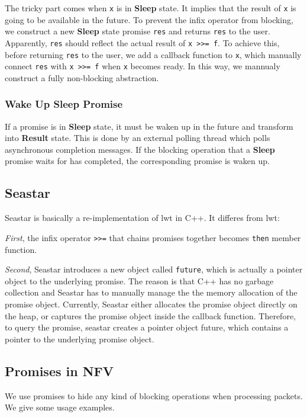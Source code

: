 The tricky part comes when \verb!x! is in \textbf{Sleep} state. It implies that
the result of \verb!x! is going to be available in the future. To prevent the
infix operator from blocking, we construct a new \textbf{Sleep} state promise
\verb!res! and returns \verb!res! to the user. Apparently, \verb!res! should
reflect the actual result of \verb!x >>= f!. To achieve this, before returning
\verb!res! to the user, we add a callback function to \verb!x!, which manually
connect \verb!res! with \verb!x >>= f! when \verb!x! becomes ready. In this way,
we mannualy construct a fully non-blocking abstraction.


\subsubsection{Wake Up Sleep Promise}

If a promise is in \textbf{Sleep} state, it must be waken up in the future and
transform into \textbf{Result} state. This is done by an external polling thread
which polls asynchronous completion messages. If the blocking operation that a
\textbf{Sleep} promise waits for has completed, the corresponding promise is
waken up.

\subsection{Seastar}

Seastar is basically a re-implementation of lwt in C++. It differes from lwt:

\textit{First}, the infix operator \verb!>>=! that chains promises together becomes
\verb!then! member function.

\textit{Second}, Seastar introduces a new object called \verb!future!, which is actually
a pointer object to the underlying promise. The reason is that C++ has no
garbage collection and Seastar has to manually manage the the memory allocation
of the promise object. Currently, Seastar either allocates the promise object
directly on the heap, or captures the promise object inside the callback
function. Therefore, to query the promise, seastar creates a pointer object
future, which contains a pointer to the underlying promise object.


\subsection{Promises in NFV}

We use promises to hide any kind of blocking operations when processing
packets. We give some usage examples.

